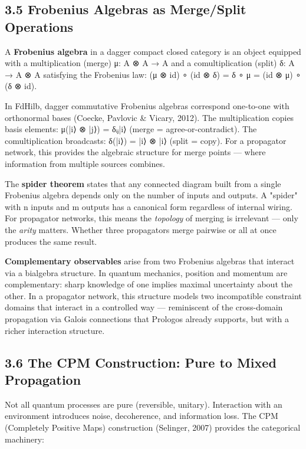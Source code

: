 \documentclass[11pt]{article}
\begin{document}
\subsection{3.5 Frobenius Algebras as Merge/Split Operations}
\label{sec:orgffd85d6}

A \textbf{Frobenius algebra} in a dagger compact closed category is an object equipped
with a multiplication (merge) μ: A ⊗ A → A and a comultiplication (split)
δ: A → A ⊗ A satisfying the Frobenius law: (μ ⊗ id) ∘ (id ⊗ δ) = δ ∘ μ =
(id ⊗ μ) ∘ (δ ⊗ id).

In FdHilb, dagger commutative Frobenius algebras correspond one-to-one with
orthonormal bases (Coecke, Pavlovic \& Vicary, 2012). The multiplication copies
basis elements: μ(|i⟩ ⊗ |j⟩) = δᵢⱼ|i⟩ (merge = agree-or-contradict). The
comultiplication broadcasts: δ(|i⟩) = |i⟩ ⊗ |i⟩ (split = copy). For a
propagator network, this provides the algebraic structure for merge points ---
where information from multiple sources combines.

The \textbf{spider theorem} states that any connected diagram built from a single
Frobenius algebra depends only on the number of inputs and outputs. A "spider"
with n inputs and m outputs has a canonical form regardless of internal wiring.
For propagator networks, this means the \emph{topology} of merging is irrelevant ---
only the \emph{arity} matters. Whether three propagators merge pairwise or all at
once produces the same result.

\textbf{Complementary observables} arise from two Frobenius algebras that interact via
a bialgebra structure. In quantum mechanics, position and momentum are
complementary: sharp knowledge of one implies maximal uncertainty about the
other. In a propagator network, this structure models two incompatible
constraint domains that interact in a controlled way --- reminiscent of
the cross-domain propagation via Galois connections that Prologos already
supports, but with a richer interaction structure.
\subsection{3.6 The CPM Construction: Pure to Mixed Propagation}
\label{sec:org9f017ad}

Not all quantum processes are pure (reversible, unitary). Interaction with an
environment introduces noise, decoherence, and information loss. The CPM
(Completely Positive Maps) construction (Selinger, 2007) provides the
categorical machinery:
\end{document}
